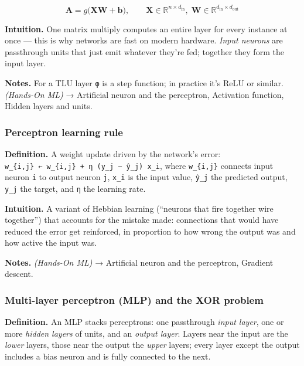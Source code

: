 \documentclass[
  10pt,
  letterpaper,
  onecolumn]{article}
\begin{document}
\begin{equation*}
\mathbf{A}=g\bigl(\mathbf{X}\mathbf{W}+\mathbf{b}\bigr),
\qquad
\mathbf{X}\in\mathbb{R}^{n\times d_{\text{in}}},\;
\mathbf{W}\in\mathbb{R}^{d_{\text{in}}\times d_{\text{out}}}
\end{equation*}

\textbf{Intuition.} One matrix multiply computes an entire layer for
every instance at once --- this is why networks are fast on modern
hardware. \emph{Input neurons} are passthrough units that just emit
whatever they're fed; together they form the input layer.

\textbf{Notes.} For a TLU layer \texttt{φ} is a step function; in
practice it's ReLU or similar. \emph{(Hands-On ML)} → Artificial neuron
and the perceptron, Activation function, Hidden layers and units.

\hypertarget{perceptron-learning-rule}{%
\subsubsection{Perceptron learning
rule}\label{perceptron-learning-rule}}

\textbf{Definition.} A weight update driven by the network's error:
\texttt{w\_\{i,j\}\ ←\ w\_\{i,j\}\ +\ η\ (y\_j\ −\ ŷ\_j)\ x\_i}, where
\texttt{w\_\{i,j\}} connects input neuron \texttt{i} to output neuron
\texttt{j}, \texttt{x\_i} is the input value, \texttt{ŷ\_j} the
predicted output, \texttt{y\_j} the target, and \texttt{η} the learning
rate.

\textbf{Intuition.} A variant of Hebbian learning (``neurons that fire
together wire together'') that accounts for the mistake made:
connections that would have reduced the error get reinforced, in
proportion to how wrong the output was and how active the input was.

\textbf{Notes.} \emph{(Hands-On ML)} → Artificial neuron and the
perceptron, Gradient descent.

\hypertarget{multi-layer-perceptron-mlp-and-the-xor-problem}{%
\subsubsection{Multi-layer perceptron (MLP) and the XOR
problem}\label{multi-layer-perceptron-mlp-and-the-xor-problem}}

\textbf{Definition.} An MLP stacks perceptrons: one passthrough
\emph{input layer}, one or more \emph{hidden layers} of units, and an
\emph{output layer}. Layers near the input are the \emph{lower} layers,
those near the output the \emph{upper} layers; every layer except the
output includes a bias neuron and is fully connected to the next.
\end{document}
